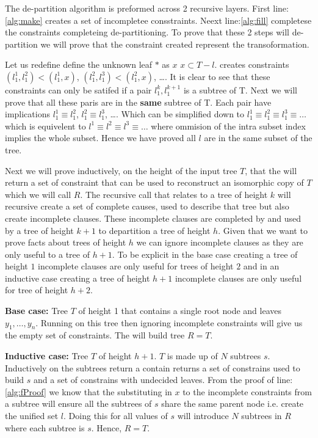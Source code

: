 The de-partition algorithm is preformed across 2 recursive layers. First line:\ref{alg:make} creates a set of incompletee consstraints. Neext line:\ref{alg:fill} completese the constraints completeing de-partitioning. To prove that these 2 steps will de-partition we will prove that the constraint created represent the transoformation.

Let us redefine define the unknown leaf $*$ as $x$  $x\subset T-l$.
 creates constraints $(l_1^1, l_1^2) < (l_1^1, x)$, $(l_1^2, l_1^3) < (l_1^2, x)$, \ldots. It is clear to see that these constraints can only be satifed if a pair $l_1^k, l_1^{k+1}$ is a subtree of T. Next we will prove that all these paris are in the \textbf{same} subtree of T. Each pair have implications $l_1^1 \equiv l_1^2$, $l_1^2 \equiv l_1^3$, \ldots. Which can be simplified down to $l_1^1 \equiv l_1^2 \equiv l_1^3 \equiv \ldots$ which is equivelent to $l^1 \equiv l^2 \equiv l^3 \equiv \ldots$ where ommision of the intra subset index implies the whole subset. Hence we have proved all $l$ are in the same subset of the tree.


Next we will prove inductively, on the height of the input tree $T$, that the  will return a set of constraint that can be used to reconstruct an isomorphic copy of $T$ which we will call $R$. The recursive call that relates to a tree of height $k$ will recursive create a set of complete causes, used to describe that tree but also create incomplete clauses. These incomplete clauses are completed by and used by a tree of height $k+1$ to departition a tree of height $h$. Given that we want to prove facts about trees of height $h$ we can ignore incomplete clauses as they are only useful to a tree of $h+1$. To be explicit in the base case creating a tree of height $1$ incomplete clauses are only useful for trees of height $2$ and in an inductive case creating a tree of height $h+1$ incomplete clauses are only useful for tree of height $h+2$.


\textbf{Base case:} Tree $T$ of height 1 that contains a single root node and leaves $y_1, \ldots, y_n$. Running  on this tree then ignoring incomplete constraints will give us the empty set of constraints. The  will build tree $R=T$. 

\textbf{Inductive case:} Tree $T$ of height $h+1$. $T$ is made up of $N$ subtrees $s$. Inductively  on the subtrees return a contain returns a set of constrains used to build $s$ and a set of constrains with undecided leaves. From the proof of  line:\ref{alg:fProof} we know that the substituting in $x$ to the incomplete constraints from a subtree will ensure all the subtrees of $s$ share the same parent node i.e. create the unified set $l$. Doing this for all values of $s$ will introduce $N$ subtrees in $R$ where each subtree is $s$. Hence, $R=T$.  

